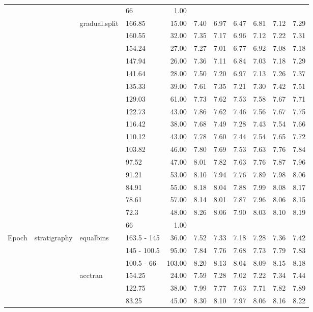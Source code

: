 \begin{longtable}{llllrrrrrrr}
   &  &  & 66 & 1.00 &  &  &  &  &  &  \\ 
   &  & gradual.split & 166.85 & 15.00 & 7.40 & 6.97 & 6.47 & 6.81 & 7.12 & 7.29 \\ 
   &  &  & 160.55 & 32.00 & 7.35 & 7.17 & 6.96 & 7.12 & 7.22 & 7.31 \\ 
   &  &  & 154.24 & 27.00 & 7.27 & 7.01 & 6.77 & 6.92 & 7.08 & 7.18 \\ 
   &  &  & 147.94 & 26.00 & 7.36 & 7.11 & 6.84 & 7.03 & 7.18 & 7.29 \\ 
   &  &  & 141.64 & 28.00 & 7.50 & 7.20 & 6.97 & 7.13 & 7.26 & 7.37 \\ 
   &  &  & 135.33 & 39.00 & 7.61 & 7.35 & 7.21 & 7.30 & 7.42 & 7.51 \\ 
   &  &  & 129.03 & 61.00 & 7.73 & 7.62 & 7.53 & 7.58 & 7.67 & 7.71 \\ 
   &  &  & 122.73 & 43.00 & 7.86 & 7.62 & 7.46 & 7.56 & 7.67 & 7.75 \\ 
   &  &  & 116.42 & 38.00 & 7.68 & 7.49 & 7.28 & 7.43 & 7.54 & 7.66 \\ 
   &  &  & 110.12 & 43.00 & 7.78 & 7.60 & 7.44 & 7.54 & 7.65 & 7.72 \\ 
   &  &  & 103.82 & 46.00 & 7.80 & 7.69 & 7.53 & 7.63 & 7.76 & 7.84 \\ 
   &  &  & 97.52 & 47.00 & 8.01 & 7.82 & 7.63 & 7.76 & 7.87 & 7.96 \\ 
   &  &  & 91.21 & 53.00 & 8.10 & 7.94 & 7.76 & 7.89 & 7.98 & 8.06 \\ 
   &  &  & 84.91 & 55.00 & 8.18 & 8.04 & 7.88 & 7.99 & 8.08 & 8.17 \\ 
   &  &  & 78.61 & 57.00 & 8.14 & 8.01 & 7.87 & 7.96 & 8.06 & 8.15 \\ 
   &  &  & 72.3 & 48.00 & 8.26 & 8.06 & 7.90 & 8.03 & 8.10 & 8.19 \\ 
   &  &  & 66 & 1.00 &  &  &  &  &  &  \\ 
  Epoch & stratigraphy & equalbins & 163.5 - 145 & 36.00 & 7.52 & 7.33 & 7.18 & 7.28 & 7.36 & 7.42 \\ 
   &  &  & 145 - 100.5 & 95.00 & 7.84 & 7.76 & 7.68 & 7.73 & 7.79 & 7.83 \\ 
   &  &  & 100.5 - 66 & 103.00 & 8.20 & 8.13 & 8.04 & 8.09 & 8.15 & 8.18 \\ 
   &  & acctran & 154.25 & 24.00 & 7.59 & 7.28 & 7.02 & 7.22 & 7.34 & 7.44 \\ 
   &  &  & 122.75 & 38.00 & 7.99 & 7.77 & 7.63 & 7.71 & 7.82 & 7.89 \\ 
   &  &  & 83.25 & 45.00 & 8.30 & 8.10 & 7.97 & 8.06 & 8.16 & 8.22 \\ 

\end{longtable}
